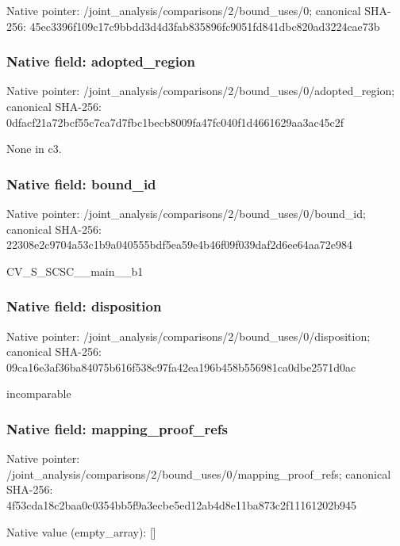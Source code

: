 \documentclass[10pt,a4paper]{article}
\begin{document}
Native pointer: /joint\_analysis/comparis\allowbreak{}ons/2/bound\_uses/0; canonical SHA-256: 45ec3396f109c17c9bbdd3d4\allowbreak{}d3fab835896fc9051fd841db\allowbreak{}c820ad3224cae73b



\subsubsection{Native field: adopted\_region}


Native pointer: /joint\_analysis/comparis\allowbreak{}ons/2/bound\_uses/0/adopt\allowbreak{}ed\_region; canonical SHA-256: 0dfacf21a72bcf55c7ca7d7f\allowbreak{}bc1becb8009fa47fc040f1d4\allowbreak{}661629aa3ac45c2f


None in c3.


\subsubsection{Native field: bound\_id}


Native pointer: /joint\_analysis/comparis\allowbreak{}ons/2/bound\_uses/0/bound\allowbreak{}\_id; canonical SHA-256: 22308e2c9704a53c1b9a0405\allowbreak{}55bdf5ea59e4b46f09f039da\allowbreak{}f2d6ee64aa72e984


CV\_S\_SCSC\_\_main\_\_b1


\subsubsection{Native field: disposition}


Native pointer: /joint\_analysis/comparis\allowbreak{}ons/2/bound\_uses/0/dispo\allowbreak{}sition; canonical SHA-256: 09ca16e3af36ba84075b616f\allowbreak{}538c97fa42ea196b458b5569\allowbreak{}81ca0dbe2571d0ac


incomparable


\subsubsection{Native field: mapping\_proof\_refs}


Native pointer: /joint\_analysis/comparis\allowbreak{}ons/2/bound\_uses/0/mappi\allowbreak{}ng\_proof\_refs; canonical SHA-256: 4f53cda18c2baa0c0354bb5f\allowbreak{}9a3ecbe5ed12ab4d8e11ba87\allowbreak{}3c2f11161202b945



Native value (empty\_array): []
\end{document}
